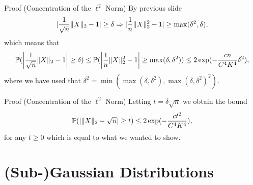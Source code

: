 \documentclass{beamer}
\begin{document}
  \begin{frame}{Proof (Concentration of the \(\ell^{2}\) Norm)}
    By previous slide
    \begin{equation}
      \abs{\frac{1}{\sqrt{n}}\norm{X}_{2} - 1} \geq \delta \Rightarrow \abs{\frac{1}{n}\norm{X}^{2}_{2} - 1} \geq \max(\delta^{2}, \delta),
    \end{equation}
    \pause which means that
    \begin{equation}
      \Pr(\abs*{\frac{1}{\sqrt{n}}\norm{X}_{2} - 1} \geq \delta) \leq \Pr(\abs*{\frac{1}{n}\norm{X}^{2}_{2} - 1} \geq \max(\delta, \delta^{2})) \leq 2 \exp(-\frac{cn}{C^{4}K^{4}}\delta^{2}),
    \end{equation}
    where we have used that \(\delta^{2} = \min(\max(\delta, \delta^{2}), \max(\delta, \delta^{2})^{2})\).
  \end{frame}

  \begin{frame}{Proof (Concentration of the \(\ell^{2}\) Norm)}
    Letting \(t = \delta \sqrt{n}\) we obtain the bound
    \begin{equation}
      \Pr(\abs{\norm{X}_{2} - \sqrt{n}} \geq t) \leq 2\exp(-\frac{ct^{2}}{C^{4}K^{4}}),
    \end{equation}
    for any \(t \geq 0\) which is equal to what we wanted to show.
  \end{frame}

  \section{(Sub-)Gaussian Distributions}
\end{document}
